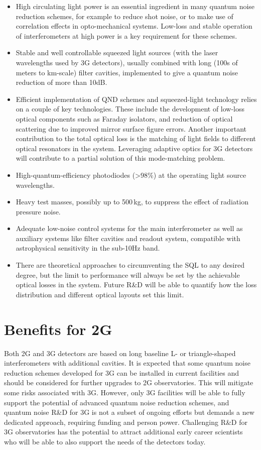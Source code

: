 \begin{itemize}
\item High circulating light power is an essential ingredient in many quantum noise reduction schemes, for example to reduce shot noise, or to make use of correlation effects in opto-mechanical systems. Low-loss and stable operation of interferometers at high power is a key requirement for these schemes.
\item Stable and well controllable squeezed light sources (with the laser wavelengths used by 3G detectors), usually combined with long (100s of meters to km-scale) filter cavities, implemented to give a quantum noise reduction of more than 10dB.
\item Efficient implementation of QND schemes and squeezed-light technology relies on a couple of key technologies. These include the development of low-loss optical components such as Faraday isolators, and reduction of optical scattering due to improved mirror surface figure errors. Another important contribution to the total optical loss is the matching of light fields to different optical resonators in the system. Leveraging adaptive optics for 3G detectors will contribute to a partial solution of this mode-matching problem. 
\item High-quantum-efficiency photodiodes (>98\%) at the operating light source wavelengths.
\item Heavy test masses, possibly up to 500\,kg, to suppress the effect of radiation pressure noise.
\item Adequate low-noise control systems for the main interferometer as well as auxiliary systems like filter cavities and readout system, compatible with astrophysical sensitivity in the sub-10Hz band.   
\item There are theoretical approaches to circumventing the SQL to any desired degree, but the limit to performance will always be set by the achievable optical losses in the system. Future R\&D will be able to quantify how the loss distribution and different optical layouts set this limit.
\end{itemize}

\section{Benefits for 2G} 
Both 2G and 3G detectors are based on long baseline L- or triangle-shaped interferometers with additional cavities.
It is expected that some quantum noise reduction schemes developed for 3G can be installed in current facilities and should be considered for further upgrades to 2G observatories. This will mitigate some risks associated with 3G. However, only 3G facilities will be able to fully support the potential of advanced quantum noise reduction schemes, and quantum noise R\&D for 3G is not a subset of ongoing efforts but demands a new dedicated approach, requiring funding and person power. Challenging R\&D for 3G observatories has the potential to attract additional early career scientists who will be able to also support the needs of the detectors today. 

